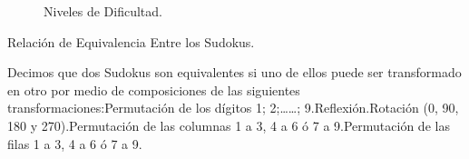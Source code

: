\documentclass[10pt,oneside]{report}
\begin{document}
{\begin{figure}[h]
\begin{center}
\caption{Niveles de Dificultad.} \end{center}\end{figure} \newpage \begin{bf} Relación de Equivalencia Entre los Sudokus.\end{bf}\newline \newline Decimos que dos Sudokus son equivalentes si uno de ellos puede ser transformado en otro por medio de composiciones de las siguientes transformaciones:\newline Permutación de los dígitos 1; 2;……; 9.\newline Reflexión.\linebreak Rotación (0, 90, 180 y 270).\newline Permutación de las columnas 1 a 3, 4 a 6 ó 7 a 9.\newline Permutación de las filas 1 a 3, 4 a 6 ó 7 a 9.\newline \newline}
\end{document}
